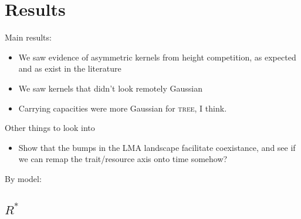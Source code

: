 \documentclass[a4paper,11pt]{article}
\newcommand{\Rstar}{\ensuremath{R^*}}
\newcommand{\TREE}{\textsc{tree}}
\begin{document}
\clearpage

\section{Results}

Main results:

\begin{itemize}
\item We saw evidence of asymmetric kernels from height competition,
  as expected and as exist in the literature
\item We saw kernels that didn't look remotely Gaussian
\item Carrying capacities were more Gaussian for \TREE, I think.
\end{itemize}

Other things to look into

\begin{itemize}
\item Show that the bumps in the LMA landscape facilitate coexistance,
  and see if we can remap the trait/resource axis onto time somehow?
\end{itemize}

By model:

\subsection{\Rstar}
\end{document}
